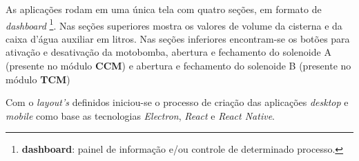As aplicações rodam em uma única tela com quatro seções, em formato de \textit{dashboard} \footnote{\textbf{dashboard}: painel de informação e/ou controle de determinado processo.}. Nas seções superiores mostra os valores de volume da cisterna e da caixa d'água auxiliar em litros. Nas seções inferiores encontram-se os botões para ativação e desativação da motobomba, abertura e fechamento do solenoide A (presente no módulo \textbf{CCM}) e abertura e fechamento do solenoide B (presente no módulo \textbf{TCM})

Com o \textit{layout's} definidos iniciou-se o processo de criação das aplicações \textit{desktop} e \textit{mobile} como base as tecnologias \textit{Electron}, \textit{React} e \textit{React Native}.